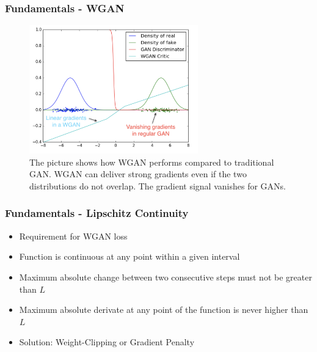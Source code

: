 \begin{frame}
    \frametitle{Fundamentals - WGAN}

    \begin{center}
        \begin{figure}[H]
            \centering
            \includegraphics[width=0.65\textwidth]{resources/images/wgan1.png}
            \caption{The picture shows how WGAN performs compared to traditional GAN. WGAN can deliver strong gradients even if the two distributions do not overlap. The gradient signal vanishes for GANs.}
            \label{fig:wgan1}
        \end{figure}
    \end{center}
\end{frame}


\begin{frame}
    \frametitle{Fundamentals - Lipschitz Continuity}

    \begin{center}
        \begin{itemize}
            \item Requirement for WGAN loss
            \item Function is continuous at any point within a given interval
            \item Maximum absolute change between two consecutive steps must not be greater than $ L $
            \item Maximum absolute derivate at any point of the function is never higher than $ L $
            \item Solution: Weight-Clipping or Gradient Penalty
        \end{itemize}
    \end{center}
\end{frame}


